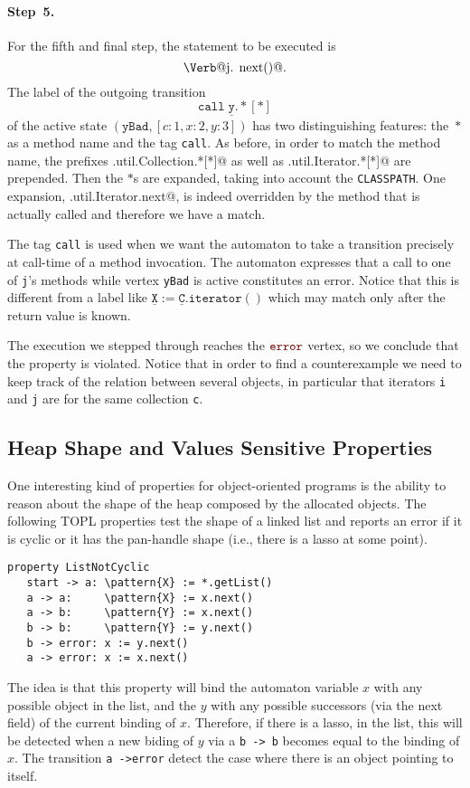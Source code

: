 \documentclass[10pt, preprint]{sigplanconf} %
\makeatletter
\newcommand{\delimitVerbatim}{\par\nobreak\smallskip\noindent}
\newcommand{\error}{\ensuremath{\textcolor{darkred}{\mathtt{error}}}\xspace}
\newcommand{\pattern}[1]{\ensuremath{\mathtt{\underline{#1}}}}
\newcommand{\verbline}[2][]{\[\text{\Verb@#2@}#1\]}
\makeatother
\begin{document}
\paragraph{Step~5.}

For the fifth and final step, the statement to be executed is \verbline[.]{j.\PY{n+na}{next}()}
The label of the outgoing transition  \[\mathtt{call}\;\pattern{y}.{*}[*]\] of the active state $(\texttt{yBad},[c:1,x:2,y:3])$
has two distinguishing features: the~$*$ as a method name and the tag \texttt{call}.
As before, in order to match the method name, the prefixes
\Verb@java.util.Collection.*[*]@ as well as \Verb@java.util.Iterator.*[*]@
are prepended.
Then the $*$s are expanded, taking into account the \texttt{CLASSPATH}.
One expansion, \Verb@java.util.Iterator.next@, is indeed
overridden by the method that is actually called and therefore 
we have a match.

The tag {\tt call} is used when we want the automaton to take a transition precisely at call-time of a method invocation.
The automaton expresses that a call to one of {\tt j}'s methods while vertex \texttt{yBad} is active constitutes an error.
Notice that this is different from a label like $\pattern X:=\pattern C.\mathtt{iterator}()$ which may match only after the return value is known.

\medskip
The execution we stepped through reaches the \error vertex, so we conclude that the property is violated.
Notice that in order to find a counterexample we need to keep track of the relation between several objects, in particular that iterators {\tt i} and {\tt j} are for the same collection {\tt c}.

\subsection{Heap Shape and Values Sensitive Properties}  %
One interesting kind of properties for object-oriented programs is the ability to reason about the shape of the heap composed by the allocated objects.
The following TOPL properties test the shape of a linked list and reports an error if it is cyclic or it has the pan-handle shape (i.e., there is a lasso at some point).
%
\delimitVerbatim
\begin{Verbatim}[commandchars=\\\{\}]
property ListNotCyclic
   start -> a: \pattern{X} := *.getList()
   a -> a:     \pattern{X} := x.next()
   a -> b:     \pattern{Y} := x.next()
   b -> b:     \pattern{Y} := y.next()
   b -> error: x := y.next()
   a -> error: x := x.next()
\end{Verbatim}
\delimitVerbatim
The idea is that this property will bind the automaton variable $x$ with any possible object in the list, and the $y$ with any possible successors (via the next field) of the current binding of $x$.
Therefore, if there is a lasso, in the list, this will be detected when a new biding of $y$ via a \texttt{b -> b} becomes equal to the binding of $x$.
The transition \texttt{a ->error} detect the case where there is an object pointing to itself.
\end{document}
